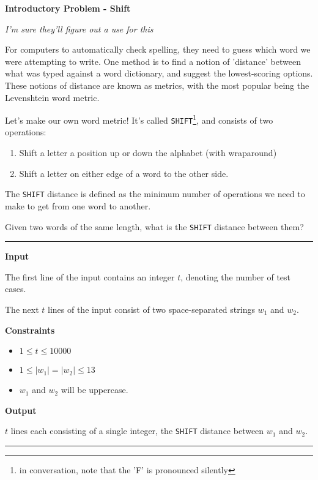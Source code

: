 \LARGE {} \textbf{Introductory Problem - Shift} \normalsize

{\itshape I'm sure they'll figure out a use for this}

For computers to automatically check spelling, 
they need to guess which word we were attempting to write.
One method is to find a notion of 'distance' between what was typed against a word dictionary, and suggest the lowest-scoring options.
These notions of distance are known as metrics, with the most popular being the Levenshtein word metric.

Let's make our own word metric! It's called \texttt{SHIFT}\footnote{in conversation, note that the 'F' is pronounced silently}, and consists of two operations:

\begin{enumerate}
    \item Shift a letter a position up or down the alphabet (with wraparound)
    \item Shift a letter on either edge of a word to the other side.
\end{enumerate}

The \texttt{SHIFT} distance is defined as the minimum number of operations we need to make to get from one word to another.

Given two words of the same length, what is the \texttt{SHIFT} distance between them?

\vspace{8pt}
\hrule

\textbf{Input}

The first line of the input contains an integer $t$, denoting the number of test cases.

The next $t$ lines of the input consist of two space-separated strings $w_1$ and $w_2$.

\textbf{Constraints}

\begin{itemize}
    \item $1 \leq t \leq 10000$
    \item $1 \leq |w_1| = |w_2| \leq 13$
    \item $w_1$ and $w_2$ will be uppercase.
\end{itemize}

\textbf{Output}

$t$ lines each consisting of a single integer, the \texttt{SHIFT} distance between $w_1$ and $w_2$.

\vspace{8pt}
\hrule

